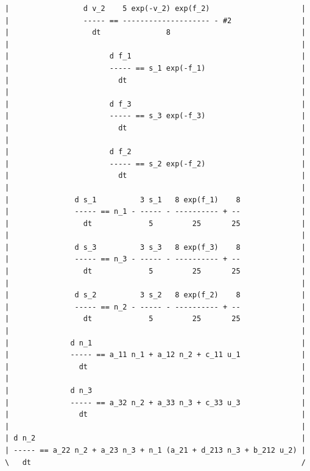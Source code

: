 \begin{itemize}
{\begin{verbatim}
|                 d v_2    5 exp(-v_2) exp(f_2)                     |
|                 ----- == -------------------- - #2                |
|                   dt               8                              |
|                                                                   |
|                       d f_1                                       |
|                       ----- == s_1 exp(-f_1)                      |
|                         dt                                        |
|                                                                   |
|                       d f_3                                       |
|                       ----- == s_3 exp(-f_3)                      |
|                         dt                                        |
|                                                                   |
|                       d f_2                                       |
|                       ----- == s_2 exp(-f_2)                      |
|                         dt                                        |
|                                                                   |
|               d s_1          3 s_1   8 exp(f_1)    8              |
|               ----- == n_1 - ----- - ---------- + --              |
|                 dt             5         25       25              |
|                                                                   |
|               d s_3          3 s_3   8 exp(f_3)    8              |
|               ----- == n_3 - ----- - ---------- + --              |
|                 dt             5         25       25              |
|                                                                   |
|               d s_2          3 s_2   8 exp(f_2)    8              |
|               ----- == n_2 - ----- - ---------- + --              |
|                 dt             5         25       25              |
|                                                                   |
|              d n_1                                                |
|              ----- == a_11 n_1 + a_12 n_2 + c_11 u_1              |
|                dt                                                 |
|                                                                   |
|              d n_3                                                |
|              ----- == a_32 n_2 + a_33 n_3 + c_33 u_3              |
|                dt                                                 |
|                                                                   |
| d n_2                                                             |
| ----- == a_22 n_2 + a_23 n_3 + n_1 (a_21 + d_213 n_3 + b_212 u_2) |
\   dt                                                              /


\end{verbatim}}
\end{itemize}
